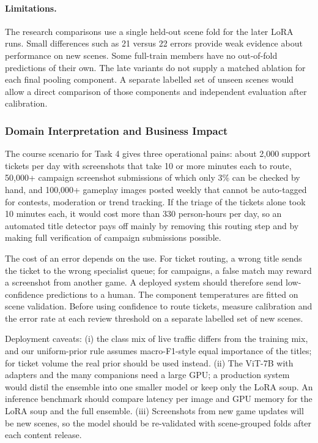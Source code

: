 \documentclass[../main.tex]{subfiles}
\begin{document}
\paragraph{Limitations.} The research comparisons use a single held-out scene fold for the later LoRA runs. Small differences such as 21 versus 22 errors provide weak evidence about performance on new scenes. Some full-train members have no out-of-fold predictions of their own. The late variants do not supply a matched ablation for each final pooling component. A separate labelled set of unseen scenes would allow a direct comparison of those components and independent evaluation after calibration.

\subsubsection{Domain Interpretation and Business Impact}

The course scenario for Task 4 gives three operational pains: about 2,000 support tickets per day with screenshots that take 10 or more minutes each to route, 50,000+ campaign screenshot submissions of which only 3\% can be checked by hand, and 100,000+ gameplay images posted weekly that cannot be auto-tagged for contests, moderation or trend tracking. If the triage of the tickets alone took 10 minutes each, it would cost more than 330 person-hours per day, so an automated title detector pays off mainly by removing this routing step and by making full verification of campaign submissions possible.

The cost of an error depends on the use. For ticket routing, a wrong title sends the ticket to the wrong specialist queue; for campaigns, a false match may reward a screenshot from another game. A deployed system should therefore send low-confidence predictions to a human. The component temperatures are fitted on scene validation. Before using confidence to route tickets, measure calibration and the error rate at each review threshold on a separate labelled set of new scenes.

Deployment caveats: (i) the class mix of live traffic differs from the training mix, and our uniform-prior rule assumes macro-F1-style equal importance of the titles; for ticket volume the real prior should be used instead. (ii) The ViT-7B with adapters and the many companions need a large GPU; a production system would distil the ensemble into one smaller model or keep only the LoRA soup. An inference benchmark should compare latency per image and GPU memory for the LoRA soup and the full ensemble. (iii) Screenshots from new game updates will be new scenes, so the model should be re-validated with scene-grouped folds after each content release.

\endgroup
\end{document}
